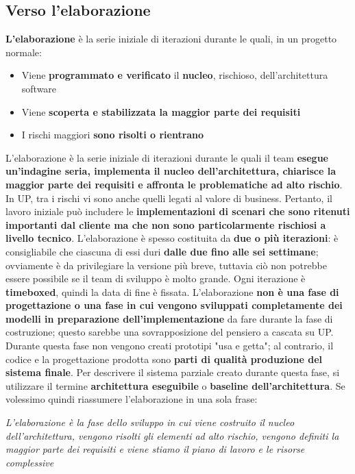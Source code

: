 \documentclass[12pt]{article}
\begin{document}
\subsection{Verso l'elaborazione}
\textbf{L'elaborazione} è la serie iniziale di iterazioni durante le quali, in un progetto normale:
\begin{itemize}
    \item Viene \textbf{programmato e verificato} il \textbf{nucleo}, rischioso, dell'architettura software
    \item Viene \textbf{scoperta e stabilizzata la maggior parte dei requisiti}
    \item I rischi maggiori \textbf{sono risolti o rientrano}
\end{itemize}
L'elaborazione è la serie iniziale di iterazioni durante le quali il team \textbf{esegue un'indagine seria, implementa il nucleo dell'architettura, chiarisce la maggior parte dei requisiti e affronta le problematiche ad alto rischio}.
In UP, tra i rischi vi sono anche quelli legati al valore di business. Pertanto, il lavoro iniziale può includere le \textbf{implementazioni di scenari che sono ritenuti importanti dal cliente ma che non sono particolarmente rischiosi a livello tecnico}.
L'elaborazione è spesso costituita da \textbf{due o più iterazioni}: è consigliabile che ciascuna di essi duri \textbf{dalle due fino alle sei settimane}; ovviamente è da privilegiare la versione più breve, tuttavia ciò non potrebbe essere possibile se il team di sviluppo è molto grande.
Ogni iterazione è \textbf{timeboxed}, quindi la data di fine è fissata.
L'elaborazione \textbf{non è una fase di progettazione o una fase in cui vengono sviluppati completamente dei modelli in preparazione dell'implementazione} da fare durante la fase di costruzione; questo sarebbe una sovrapposizione del pensiero a cascata su UP.
Durante questa fase non vengono creati prototipi "usa e getta"; al contrario, il codice e la progettazione prodotta sono \textbf{parti di qualità produzione del sistema finale}.
Per descrivere il sistema parziale creato durante questa fase, si utilizzare il termine \textbf{architettura eseguibile} o \textbf{baseline dell'architettura}.
Se volessimo quindi riassumere l'elaborazione in una sola frase:
\begin{center}
    \textit{L'elaborazione è la fase dello sviluppo in cui viene costruito il nucleo dell'architettura, vengono risolti gli elementi ad alto rischio, vengono definiti la maggior parte dei requisiti e viene stiamo il piano di lavoro e le risorse complessive}
\end{center}
\end{document}
